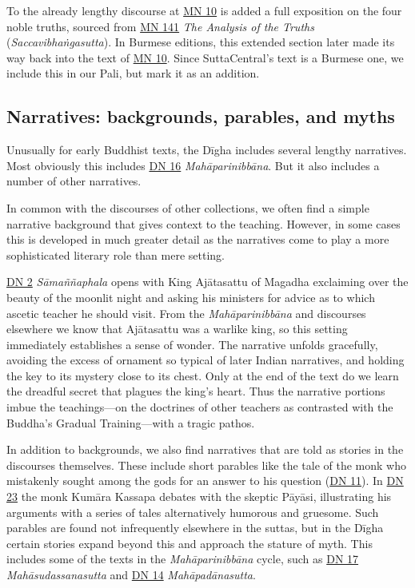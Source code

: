 \documentclass[12pt,openany]{book}%
\begin{document}
To the already lengthy discourse at \href{https://suttacentral.net/mn10}{MN 10} is added a full exposition on the four noble truths, sourced from \href{https://suttacentral.net/mn141}{MN 141} \textit{The Analysis of the Truths} (\textit{\textsanskrit{Saccavibhaṅgasutta}}). In Burmese editions, this extended section later made its way back into the text of \href{https://suttacentral.net/mn10}{MN 10}. Since SuttaCentral’s text is a Burmese one, we include this in our Pali, but mark it as an addition.

\subsection*{Narratives: backgrounds, parables, and myths}

Unusually for early Buddhist texts, the \textsanskrit{Dīgha} includes several lengthy narratives. Most obviously this includes \href{https://suttacentral.net/dn16}{DN 16} \textit{\textsanskrit{Mahāparinibbāna}}. But it also includes a number of other narratives.

In common with the discourses of other collections, we often find a simple narrative background that gives context to the teaching. However, in some cases this is developed in much greater detail as the narratives come to play a more sophisticated literary role than mere setting.

\href{https://suttacentral.net/dn2}{DN 2} \textit{\textsanskrit{Sāmaññaphala}} opens with King \textsanskrit{Ajātasattu} of Magadha exclaiming over the beauty of the moonlit night and asking his ministers for advice as to which ascetic teacher he should visit. From the \textit{\textsanskrit{Mahāparinibbāna}} and discourses elsewhere we know that \textsanskrit{Ajātasattu} was a warlike king, so this setting immediately establishes a sense of wonder. The narrative unfolds gracefully, avoiding the excess of ornament so typical of later Indian narratives, and holding the key to its mystery close to its chest. Only at the end of the text do we learn the dreadful secret that plagues the king’s heart. Thus the narrative portions imbue the teachings—on the doctrines of other teachers as contrasted with the Buddha’s Gradual Training—with a tragic pathos.

In addition to backgrounds, we also find narratives that are told as stories in the discourses themselves. These include short parables like the tale of the monk who mistakenly sought among the gods for an answer to his question (\href{https://suttacentral.net/dn11}{DN 11}). In \href{https://suttacentral.net/dn23}{DN 23} the monk \textsanskrit{Kumāra} Kassapa debates with the skeptic \textsanskrit{Pāyāsi}, illustrating his arguments with a series of tales alternatively humorous and gruesome. Such parables are found not infrequently elsewhere in the suttas, but in the \textsanskrit{Dīgha} certain stories expand beyond this and approach the stature of myth. This includes some of the texts in the \textit{\textsanskrit{Mahāparinibbāna}} cycle, such as \href{https://suttacentral.net/dn17}{DN 17} \textit{\textsanskrit{Mahāsudassanasutta}} and \href{https://suttacentral.net/dn14}{DN 14} \textit{\textsanskrit{Mahāpadānasutta}}.
\end{document}
